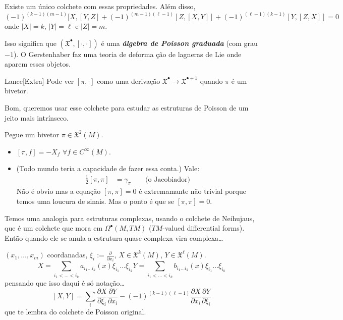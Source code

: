 \begin{thm}\leavevmode
Existe um único colchete com essas propriedades. Além disso,
\[(-1)^{(k-1)(m-1)}[X,[Y,Z]+(-1)^{(m-1)(\ell-1)}[Z,[X,Y]]+(-1)^{(\ell-1)(k-1)}[Y,[Z,X]]=0\]
onde \(|X|=k\), \(|Y|=\ell\) e \(|Z|=m\).
\end{thm}

Isso significa que \((\mathfrak{X}^\bullet,[\cdot,\cdot])\) é uma \textit{\textbf{álgebra de Poisson graduada}} (com grau \(-1\)). O Gerstenhaber faz uma teoria de deforma ção de lagneras de Lie onde aparem esses objetos.

\begin{thing6}{Lance}[Extra]\leavevmode
	Pode ver \([\pi,\cdot]\) como uma derivação \(\mathfrak{X}^\bullet \to \mathfrak{X}^{\bullet+1}\) quando \(\pi\) é um bivetor.
\end{thing6}

Bom, queremos usar esse colchete para estudar as estruturas de Poisson de um jeito mais intrínseco.

\begin{exercise}\leavevmode
	Pegue um bivetor \(\pi \in \mathfrak{X}^2(M)\).
	\begin{itemize}
		\item \([\pi,f]=-X_f\) \(\forall  f\in C^\infty(M)\).
		\item (Todo mundo teria a capacidade de fazer essa conta.) Vale:
			\begin{align*}
				\frac{1}{2}[\pi,\pi]&=\gamma_\pi \qquad \text{(o Jacobiador)} 
			\end{align*}
			Não é obvio mas a equação \([\pi,\pi]=0\) é extremamante não trivial porque temos uma loucura de sinais. Mas o ponto é que se  \([\pi,\pi]=0\).
	\end{itemize}
\end{exercise}

\begin{remark}\leavevmode
Temos uma analogia para estruturas complexas, usando o colchete de Neihujaus, que é um colchete que mora em \(\Omega^{\bullet}(M,TM)\) (\(TM\)-valued differential forms). Então quando ele se anula a estrutura quase-complexa vira complexa…
\end{remark}

\begin{remark}\leavevmode
\((x_1,\ldots,x_m)\) coordanadas, \(\xi_i:= \frac{\partial }{\partial x_i}\), \(X \in \mathfrak{X}^k(M)\), \(Y \in \mathfrak{X}^\ell(M)\).
\[X= \sum_{i_1<\ldots<i_k}a_{i_1\ldots i_k}(x)\xi_{i_1}\ldots\xi_{i_k}Y=\sum_{i_1<\ldots<i_k}b_{i_1\ldots i_k}(x)\xi_{i_1}\ldots\xi_{i_k}\]
pensando que isso daqui é só notação…
\[[X,Y]=\sum_{i}\frac{\partial X}{\partial \xi_i}\frac{\partial Y}{\partial x_i}-(-1)^{(k-1)(\ell-1)}\frac{\partial X}{\partial x_i}\frac{\partial Y}{\partial \xi_i}\]
que te lembra do colchete de Poisson original.

\end{remark}




